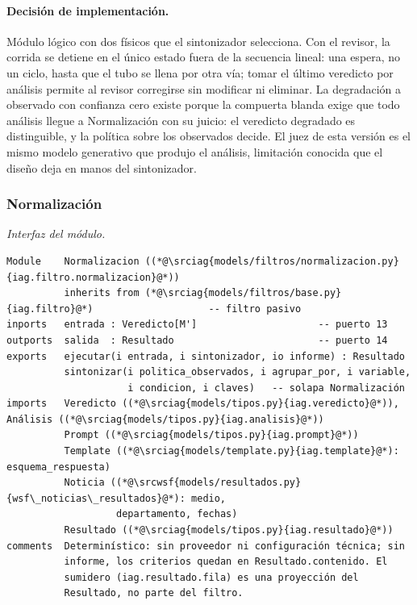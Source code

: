 \documentclass[12pt]{report}
\newcommand{\wsfrepo}{https://github.com/wsf/wsfnoticias}
\newcommand{\wsfref}{aa59c466581c0ce83c16f88f63d6021e9039fbcd}
\newcommand{\srcwsf}[2]{\href{\wsfrepo/blob/\wsfref/#1}{#2}}
\newcommand{\iagrepo}{https://github.com/lbassani12/noticias_iag}
\newcommand{\iagref}{bca7dba0bc76cf5533bd8df1d9a27493d498942d}
\newcommand{\srciag}[2]{\href{\iagrepo/blob/\iagref/#1}{#2}}
\begin{document}
\paragraph{Decisión de implementación.} Módulo lógico con dos físicos que el sintonizador selecciona. Con el revisor, la corrida se detiene en el único estado fuera de la secuencia lineal: una espera, no un ciclo, hasta que el tubo se llena por otra vía; tomar el último veredicto por análisis permite al revisor corregirse sin modificar ni eliminar. La degradación a observado con confianza cero existe porque la compuerta blanda exige que todo análisis llegue a Normalización con su juicio: el veredicto degradado es distinguible, y la política sobre los observados decide. El juez de esta versión es el mismo modelo generativo que produjo el análisis, limitación conocida que el diseño deja en manos del sintonizador.


\subsubsection{Normalización}
\label{sec:impl-mat-normalizacion}

\noindent\begin{minipage}{\linewidth}
  \textit{Interfaz del módulo.}
  \begin{lstlisting}[style=implbloque]
Module    Normalizacion ((*@\srciag{models/filtros/normalizacion.py}{iag.filtro.normalizacion}@*))
          inherits from (*@\srciag{models/filtros/base.py}{iag.filtro}@*)                    -- filtro pasivo
inports   entrada : Veredicto[M']                     -- puerto 13
outports  salida  : Resultado                         -- puerto 14
exports   ejecutar(i entrada, i sintonizador, io informe) : Resultado
          sintonizar(i politica_observados, i agrupar_por, i variable,
                     i condicion, i claves)   -- solapa Normalización
imports   Veredicto ((*@\srciag{models/tipos.py}{iag.veredicto}@*)), Análisis ((*@\srciag{models/tipos.py}{iag.analisis}@*))
          Prompt ((*@\srciag{models/tipos.py}{iag.prompt}@*))
          Template ((*@\srciag{models/template.py}{iag.template}@*): esquema_respuesta)
          Noticia ((*@\srcwsf{models/resultados.py}{wsf\_noticias\_resultados}@*): medio,
                   departamento, fechas)
          Resultado ((*@\srciag{models/tipos.py}{iag.resultado}@*))
comments  Determinístico: sin proveedor ni configuración técnica; sin
          informe, los criterios quedan en Resultado.contenido. El
          sumidero (iag.resultado.fila) es una proyección del
          Resultado, no parte del filtro.
\end{lstlisting}
\end{minipage}
\end{document}
